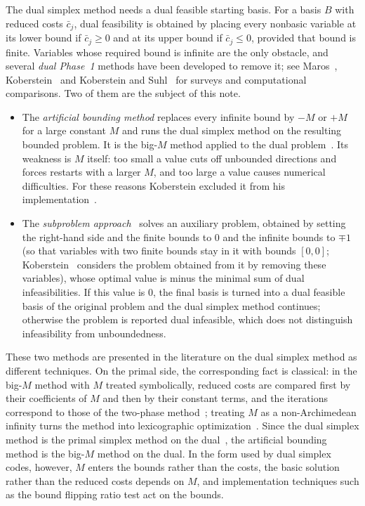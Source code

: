 \documentclass[11pt,a4paper]{article}
\theoremstyle{plain}
\theoremstyle{definition}
\theoremstyle{remark}
\begin{document}
The dual simplex method needs a dual feasible starting basis. For a basis $B$ with reduced costs $\bar c_j$, dual feasibility is obtained by placing every nonbasic variable at its lower bound if $\bar c_j\ge0$ and at its upper bound if $\bar c_j\le0$, provided that bound is finite. Variables whose required bound is infinite are the only obstacle, and several \emph{dual Phase~1} methods have been developed to remove it; see Maros~\cite{maros2003}, Koberstein~\cite{koberstein2005} and Koberstein and Suhl~\cite{koberstein2007} for surveys and computational comparisons. Two of them are the subject of this note.
\begin{itemize}
\item The \emph{artificial bounding method} replaces every infinite bound by $-M$ or $+M$ for a large constant $M$ and runs the dual simplex method on the resulting bounded problem. It is the big-$M$ method applied to the dual problem~\cite{wolfe1965,koberstein2005}. Its weakness is $M$ itself: too small a value cuts off unbounded directions and forces restarts with a larger $M$, and too large a value causes numerical difficulties. For these reasons Koberstein excluded it from his implementation~\cite{koberstein2005}.
\item The \emph{subproblem approach}~\cite{fourer1994,koberstein2005,koberstein2007} solves an auxiliary problem, obtained by setting the right-hand side and the finite bounds to $0$ and the infinite bounds to $\mp1$ (so that variables with two finite bounds stay in it with bounds $[0,0]$; Koberstein~\cite{koberstein2005} considers the problem obtained from it by removing these variables), whose optimal value is minus the minimal sum of dual infeasibilities. If this value is $0$, the final basis is turned into a dual feasible basis of the original problem and the dual simplex method continues; otherwise the problem is reported dual infeasible, which does not distinguish infeasibility from unboundedness.
\end{itemize}
These two methods are presented in the literature on the dual simplex method as different techniques. On the primal side, the corresponding fact is classical: in the big-$M$ method with $M$ treated symbolically, reduced costs are compared first by their coefficients of $M$ and then by their constant terms, and the iterations correspond to those of the two-phase method~\cite[Sect.~4.3]{bazaraa2010}; treating $M$ as a non-Archimedean infinity turns the method into lexicographic optimization~\cite{sherali1983,cococcioni2021}. Since the dual simplex method is the primal simplex method on the dual~\cite{lemke1954}, the artificial bounding method is the big-$M$ method on the dual. In the form used by dual simplex codes, however, $M$ enters the bounds rather than the costs, the basic solution rather than the reduced costs depends on $M$, and implementation techniques such as the bound flipping ratio test act on the bounds.
\end{document}
